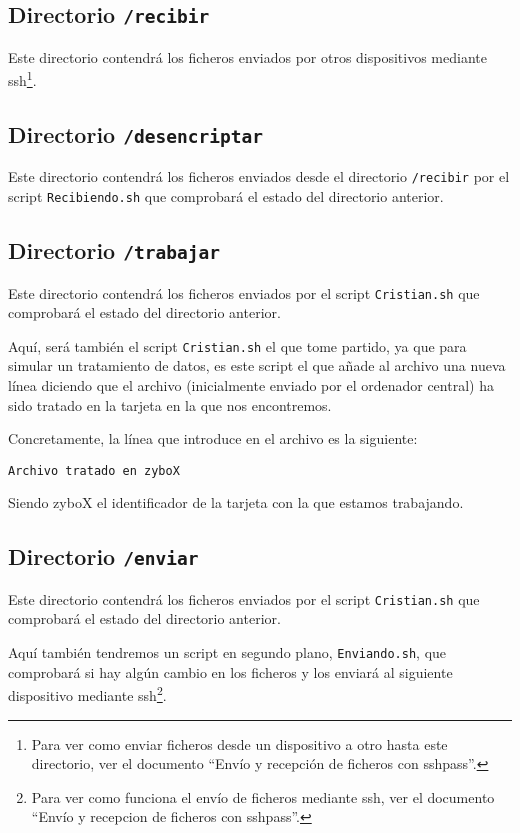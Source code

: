 \documentclass[12pt,letterpaper]{article}
\begin{document}
\subsection{Directorio \texttt{/recibir}}
Este directorio contendrá los ficheros enviados por otros dispositivos mediante ssh\footnote{Para ver como enviar ficheros desde un dispositivo a otro hasta este directorio, ver el documento ``Envío y recepción de ficheros con sshpass''.}.

\subsection{Directorio \texttt{/desencriptar}}
Este directorio contendrá los ficheros enviados desde el directorio \texttt{/recibir} por el script \texttt{Recibiendo.sh} que comprobará el estado del directorio anterior.

\subsection{Directorio \texttt{/trabajar}}
Este directorio contendrá los ficheros enviados por el script \texttt{Cristian.sh} que comprobará el estado del directorio anterior.

Aquí, será también el script \texttt{Cristian.sh} el que tome partido, ya que para simular un tratamiento de datos, es este script el que añade al archivo una nueva línea diciendo que el archivo (inicialmente enviado por el ordenador central) ha sido tratado en la tarjeta en la que nos encontremos.

Concretamente, la línea que introduce en el archivo es la siguiente:
\begin{center}
	\texttt{Archivo tratado en zyboX}
\end{center}

Siendo zyboX el identificador de la tarjeta con la que estamos trabajando.

\subsection{Directorio \texttt{/enviar}}
Este directorio contendrá los ficheros enviados por el script \texttt{Cristian.sh} que comprobará el estado del directorio anterior.

Aquí también tendremos un script en segundo plano, \texttt{Enviando.sh}, que comprobará si hay algún cambio en los ficheros y los enviará al siguiente dispositivo mediante ssh\footnote{Para ver como funciona el envío de ficheros mediante ssh, ver el documento ``Envío y recepcion de ficheros con sshpass''.}.
\end{document}
